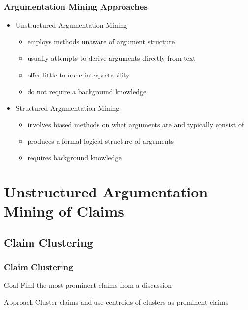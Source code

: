 \documentclass{beamer}
\begin{document}
\begin{frame}
\frametitle{Argumentation Mining Approaches}

\begin{itemize}
\item Unstructured Argumentation Mining
	\begin{itemize}
		\item employs methods unaware of argument structure
		\item usually attempts to derive arguments directly from text
		\item offer little to none interpretability
		\item do not require a background knowledge
	\end{itemize}
\item Structured Argumentation Mining
	\begin{itemize}
		\item involves biased methods on what arguments are and typically consist of
		\item produces a formal logical structure of arguments
		\item requires background knowledge
	\end{itemize}
\end{itemize}

\end{frame}


\section{Unstructured Argumentation Mining of Claims}

\subsection{Claim Clustering}

\begin{frame}
	\frametitle{Claim Clustering}
	\begin{block}{Goal}
		Find the most prominent claims from a discussion
	\end{block}

	\begin{block}{Approach}
		Cluster claims and use centroids of clusters as prominent claims
	\end{block}
\end{frame}
\end{document}

